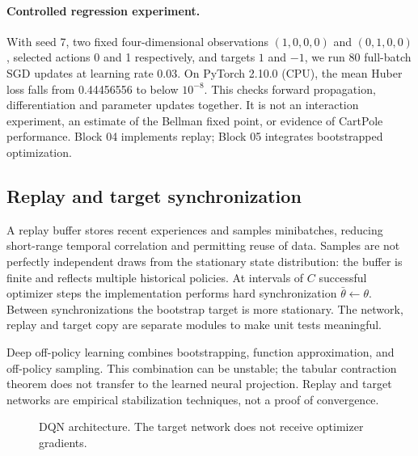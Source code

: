 \documentclass[11pt,a4paper]{article}
\begin{document}
\paragraph{Controlled regression experiment.} With seed 7, two fixed four-dimensional observations $(1,0,0,0)$ and $(0,1,0,0)$, selected actions 0 and 1 respectively, and targets $1$ and $-1$, we run 80 full-batch SGD updates at learning rate 0.03. On PyTorch 2.10.0 (CPU), the mean Huber loss falls from 0.44456556 to below $10^{-8}$. This checks forward propagation, differentiation and parameter updates together. It is not an interaction experiment, an estimate of the Bellman fixed point, or evidence of CartPole performance. Block 04 implements replay; Block 05 integrates bootstrapped optimization.

\subsection{Replay and target synchronization}
A replay buffer stores recent experiences and samples minibatches, reducing short-range temporal correlation and permitting reuse of data. Samples are not perfectly independent draws from the stationary state distribution: the buffer is finite and reflects multiple historical policies. At intervals of $C$ successful optimizer steps the implementation performs hard synchronization $\bar\theta\leftarrow\theta$. Between synchronizations the bootstrap target is more stationary. The network, replay and target copy are separate modules to make unit tests meaningful.

Deep off-policy learning combines bootstrapping, function approximation, and off-policy sampling. This combination can be unstable; the tabular contraction theorem does not transfer to the learned neural projection. Replay and target networks are empirical stabilization techniques, not a proof of convergence.

\begin{figure}[ht]
\centering
{}
\caption{DQN architecture. The target network does not receive optimizer gradients.}\label{fig:dqn}
\end{figure}
\end{document}

